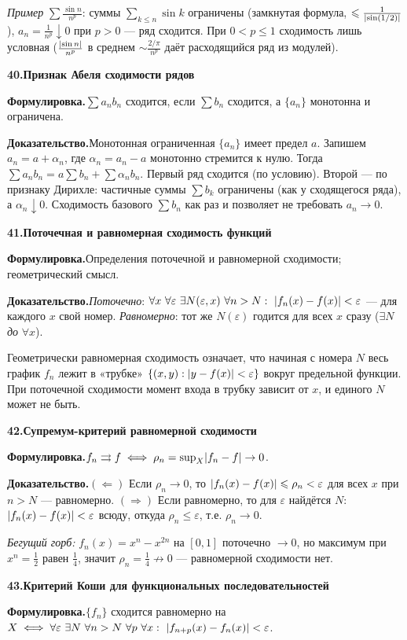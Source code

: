 \documentclass[10pt,a4paper]{article}
\newcommand{\eps}{\varepsilon}
\renewcommand{\le}{\leqslant}
\DeclarePairedDelimiter{\abs}{\lvert}{\rvert}
\theoremstyle{definition}
\theoremstyle{plain}
\newcommand{\writespace}{\vspace{7.5mm}}
\newcommand{\prf}[2]{%
  \par\writespace\noindent
  {\large\bfseries\color{accent}#1.\enspace #2}\par\smallskip}
\newcommand{\stmt}{\par\noindent\textbf{Формулировка.}\enspace}
\newcommand{\dok}{\par\noindent\textbf{Доказательство.}\enspace}
\begin{document}
\emph{Пример} $\sum\tfrac{\sin n}{n^p}$:
суммы $\sum_{k\le n}\sin k$ ограничены (замкнутая формула, $\le\tfrac1{\abs{\sin(1/2)}}$),
$a_n=\tfrac1{n^p}\downarrow0$ при $p>0$ — ряд сходится. При $0<p\le1$ сходимость лишь условная
($\tfrac{\abs{\sin n}}{n^p}$ в среднем $\sim\tfrac{2/\pi}{n^p}$ даёт расходящийся ряд из модулей).

\prf{40}{Признак Абеля сходимости рядов}
\stmt $\sum a_n b_n$ сходится, если $\sum b_n$ сходится, а $\{a_n\}$ монотонна и ограничена.

\dok Монотонная ограниченная $\{a_n\}$ имеет предел $a$. Запишем $a_n=a+\alpha_n$, где
$\alpha_n=a_n-a$ монотонно стремится к нулю. Тогда $\sum a_n b_n=a\sum b_n+\sum\alpha_n b_n$. Первый
ряд сходится (по условию). Второй — по признаку Дирихле: частичные суммы $\sum b_k$ ограничены (как
у сходящегося ряда), а $\alpha_n\downarrow0$. Сходимость базового $\sum b_n$ как раз и позволяет не
требовать $a_n\to0$.

\prf{41}{Поточечная и равномерная сходимость функций}
\stmt Определения поточечной и равномерной сходимости; геометрический смысл.

\dok \emph{Поточечно}: $\forall x\ \forall\eps\ \exists N(\eps,x)\ \forall n>N:\
\abs{f_n(x)-f(x)}<\eps$ — для каждого $x$ свой номер. \emph{Равномерно}: тот же $N(\eps)$ годится
для всех $x$ сразу ($\exists N$ \emph{до} $\forall x$).

Геометрически равномерная сходимость
означает, что начиная с номера $N$ весь график $f_n$ лежит в «трубке»
$\{(x,y):\abs{y-f(x)}<\eps\}$ вокруг предельной функции. При поточечной сходимости момент входа в
трубку зависит от $x$, и единого $N$ может не быть.

\prf{42}{Супремум-критерий равномерной сходимости}
\stmt $f_n\rightrightarrows f\iff\rho_n=\sup_X\abs{f_n-f}\to0$.

\dok $(\Leftarrow)$ Если $\rho_n\to0$, то $\abs{f_n(x)-f(x)}\le\rho_n<\eps$ для всех $x$ при $n>N$ —
равномерно. $(\Rightarrow)$ Если равномерно, то для $\eps$ найдётся $N$: $\abs{f_n(x)-f(x)}<\eps$
всюду, откуда $\rho_n\le\eps$, т.е. $\rho_n\to0$.

\emph{Бегущий горб:} $f_n(x)=x^n-x^{2n}$ на
$[0,1]$ поточечно $\to0$, но максимум при $x^n=\tfrac12$ равен $\tfrac14$, значит
$\rho_n=\tfrac14\not\to0$ — равномерной сходимости нет.

\prf{43}{Критерий Коши для функциональных последовательностей}
\stmt $\{f_n\}$ сходится равномерно на $X\iff\forall\eps\ \exists N\ \forall n>N\ \forall p\
\forall x:\ \abs{f_{n+p}(x)-f_n(x)}<\eps$.
\end{document}
